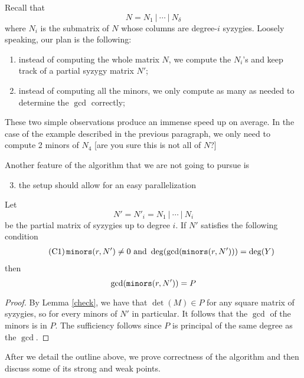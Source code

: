 \documentclass[fleqn,reqno]{amsart}
\numberwithin{first}{chapter}
\begin{document}
\begin{paragraf}
Recall that
\[
	N=N_1~|~\cdots~|~N_\delta
\]
where $N_i$ is the submatrix of $N$ whose columns are degree-$i$ syzygies.
Loosely speaking, our plan is the following:
\begin{enumerate}
\item
instead of computing the whole matrix $N$, we compute the $N_i$'s and keep track
of a partial syzygy matrix $N'$;
\item
instead of computing all the minors, we only compute as many as needed
to determine the $\gcd$ correctly;
\end{enumerate}

These two simple observations produce an immense speed up on average.
In the case of the example described in the previous paragraph,
we only need to compute 2 minors of $N_4$ [are you sure this is not all of $N$?]

Another feature of the algorithm that we are not going to pursue is

\begin{enumerate}
\setcounter{enumi}{2}
\item
\label{superhui}
the setup should allow for an easy parallelization
\end{enumerate}
\end{paragraf}

\begin{lemma}
\label{lemma:C1}
Let
\[
	N'=N'_i=N_1~|~\cdots~|~N_i
\]
be the partial matrix of syzygies up to degree $i$.
If $N'$ satisfies the following condition
\begin{align}
	\label{C:OK-matrix}
	\tag{C1}
	\mathop{\tt minors}(r,N')\neq0 \text{ and } \deg(\gcd(\mathop{\tt minors}(r,N')))=\deg(Y)
\end{align}
then
\[
\gcd(\mathop{\tt minors}(r,N'))=P
\]
\end{lemma}

\begin{proof}
By Lemma \ref{check}, we have that $\det(M)\in P$ for any square matrix of syzygies,
so for every minors of $N'$ in particular.
It follows that the $\gcd$ of the minors is in $P$.
The sufficiency follows since $P$ is principal of the same degree as the $\gcd$.
\end{proof}

\begin{paragraf}
After we detail the outline above, we prove correctness of the algorithm and
then discuss some of its strong and weak points.
\end{paragraf}
\end{document}
